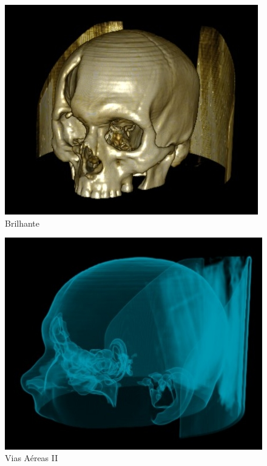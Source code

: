 \begin{figure}[!htb]
\centering
\includegraphics[scale=0.68]{../user_guide_figures/invesalius_screen/brilhante_I.jpg}
\caption{Brilhante}
\label{fig:brilhante_I}
\end{figure}

\begin{figure}[!htb]
\centering 
\includegraphics[scale=0.65]{../user_guide_figures/invesalius_screen/vias_aereas_II.jpg}
\caption{Vias Aéreas II}
\label{fig:vias_aereas_II} 
\end{figure}

